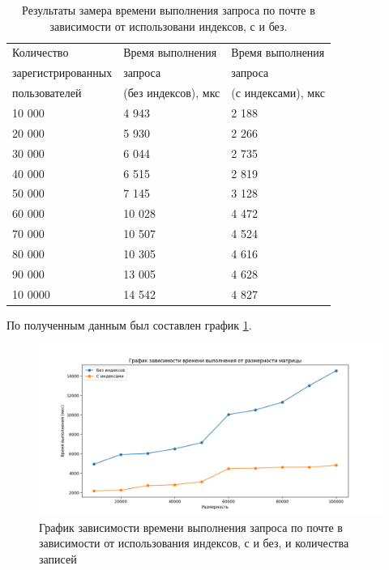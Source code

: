 \begin{table}[!ht]
    \centering
    \caption{\label{tab:res} Результаты замера времени выполнения запроса
    по почте в зависимости от использовани индексов, с и без.}
    \begin{tabular}{|l|l|l|}
    \hline
        Количество  & Время выполнения & Время выполнения\\
        зарегистрированных & запроса & запроса \\
        пользователей & (без индексов), мкс & (с индексами), мкс \\ \hline
        10 000 & 4 943 & 2 188 \\ \hline
        20 000 & 5 930 & 2 266 \\ \hline
        30 000 & 6 044 & 2 735 \\ \hline
        40 000 & 6 515 & 2 819 \\ \hline
        50 000 & 7 145 & 3 128 \\ \hline
        60 000 & 10 028 & 4 472 \\ \hline
        70 000 & 10 507 & 4 524 \\ \hline
        80 000 & 10 305 & 4 616 \\ \hline
        90 000 & 13 005 & 4 628 \\ \hline
        10 0000 & 14 542 & 4 827 \\ \hline
    \end{tabular}
\end{table}

По полученным данным был составлен график \ref{graph:res}.

\begin{figure}[H]
    \includegraphics[width=1\linewidth]{img/graph.png}
    \caption{\label{graph:res} График зависимости времени выполнения запроса
    по почте в зависимости от использования индексов, с и без, и количества записей }
\end{figure}
\noindent


